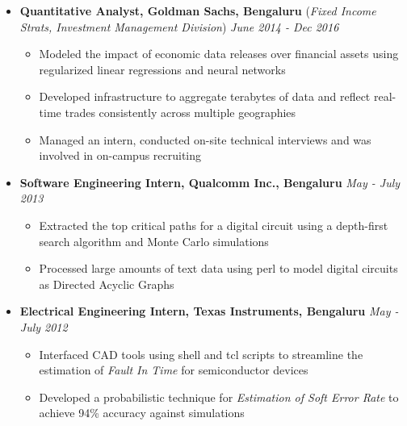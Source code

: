 \documentclass[10pt,a4paper,English]{article}
\newcommand\itemyear[1]{\hfill \emph{\color{itemyear} #1}}
\newcommand\itemenv{\setlength\itemsep{0.5pt} \addtolength{\itemindent}{-5mm}\vspace{-1.5mm}}
\begin{document}
\begin{itemize}
    \item \textbf{Quantitative Analyst, Goldman Sachs, Bengaluru} \hfill (\emph{Fixed Income Strats, Investment Management Division}) \itemyear{June 2014 - Dec 2016}
        \begin{itemize} \itemenv
            \item Modeled the impact of economic data releases over financial assets using regularized linear regressions and neural networks
            \item Developed infrastructure to aggregate terabytes of data and reflect real-time trades consistently across multiple geographies
            \item Managed an intern, conducted on-site technical interviews and was involved in on-campus recruiting
        \end{itemize}

    \item \textbf{Software Engineering Intern, Qualcomm Inc., Bengaluru} \itemyear{May - July 2013}
        \begin{itemize} \itemenv
            \item Extracted the top critical paths for a digital circuit using a depth-first search algorithm and Monte Carlo simulations
            \item Processed large amounts of text data using perl to model digital circuits as Directed Acyclic Graphs
        \end{itemize}

    \item \textbf{Electrical Engineering Intern, Texas Instruments, Bengaluru} \itemyear{May - July 2012}
        \begin{itemize} \itemenv
            \item Interfaced CAD tools using shell and tcl scripts to streamline the estimation of \textit{Fault In Time} for semiconductor devices
            \item Developed a probabilistic technique for \emph{Estimation of Soft Error Rate} to achieve 94\% accuracy against simulations
        \end{itemize}


\end{itemize}
\end{document}
